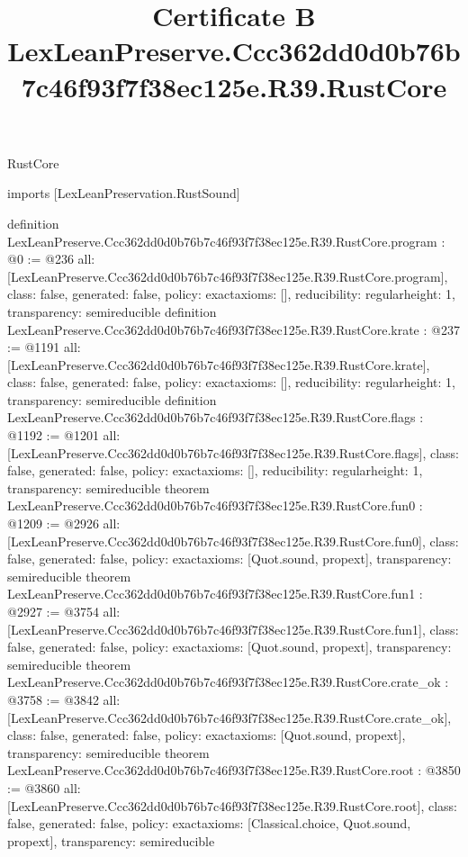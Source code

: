 \begin{lexlean}{RustCore}
\title{Certificate B LexLeanPreserve.Ccc362dd0d0b76b7c46f93f7f38ec125e.R39.RustCore}
\begin{coremodule}
imports [LexLeanPreservation.RustSound]

definition LexLeanPreserve.Ccc362dd0d0b76b7c46f93f7f38ec125e.R39.RustCore.program : @0 := @236 {
  all: [LexLeanPreserve.Ccc362dd0d0b76b7c46f93f7f38ec125e.R39.RustCore.program],
  class: false,
  generated: false,
  policy: exact{axioms: []},
  reducibility: regular{height: 1},
  transparency: semireducible
}
definition LexLeanPreserve.Ccc362dd0d0b76b7c46f93f7f38ec125e.R39.RustCore.krate : @237 := @1191 {
  all: [LexLeanPreserve.Ccc362dd0d0b76b7c46f93f7f38ec125e.R39.RustCore.krate],
  class: false,
  generated: false,
  policy: exact{axioms: []},
  reducibility: regular{height: 1},
  transparency: semireducible
}
definition LexLeanPreserve.Ccc362dd0d0b76b7c46f93f7f38ec125e.R39.RustCore.flags : @1192 := @1201 {
  all: [LexLeanPreserve.Ccc362dd0d0b76b7c46f93f7f38ec125e.R39.RustCore.flags],
  class: false,
  generated: false,
  policy: exact{axioms: []},
  reducibility: regular{height: 1},
  transparency: semireducible
}
theorem LexLeanPreserve.Ccc362dd0d0b76b7c46f93f7f38ec125e.R39.RustCore.fun0 : @1209 := @2926 {
  all: [LexLeanPreserve.Ccc362dd0d0b76b7c46f93f7f38ec125e.R39.RustCore.fun0],
  class: false,
  generated: false,
  policy: exact{axioms: [Quot.sound, propext]},
  transparency: semireducible
}
theorem LexLeanPreserve.Ccc362dd0d0b76b7c46f93f7f38ec125e.R39.RustCore.fun1 : @2927 := @3754 {
  all: [LexLeanPreserve.Ccc362dd0d0b76b7c46f93f7f38ec125e.R39.RustCore.fun1],
  class: false,
  generated: false,
  policy: exact{axioms: [Quot.sound, propext]},
  transparency: semireducible
}
theorem LexLeanPreserve.Ccc362dd0d0b76b7c46f93f7f38ec125e.R39.RustCore.crate_ok : @3758 := @3842 {
  all: [LexLeanPreserve.Ccc362dd0d0b76b7c46f93f7f38ec125e.R39.RustCore.crate_ok],
  class: false,
  generated: false,
  policy: exact{axioms: [Quot.sound, propext]},
  transparency: semireducible
}
theorem LexLeanPreserve.Ccc362dd0d0b76b7c46f93f7f38ec125e.R39.RustCore.root : @3850 := @3860 {
  all: [LexLeanPreserve.Ccc362dd0d0b76b7c46f93f7f38ec125e.R39.RustCore.root],
  class: false,
  generated: false,
  policy: exact{axioms: [Classical.choice, Quot.sound, propext]},
  transparency: semireducible
}


\end{coremodule}
\end{lexlean}
